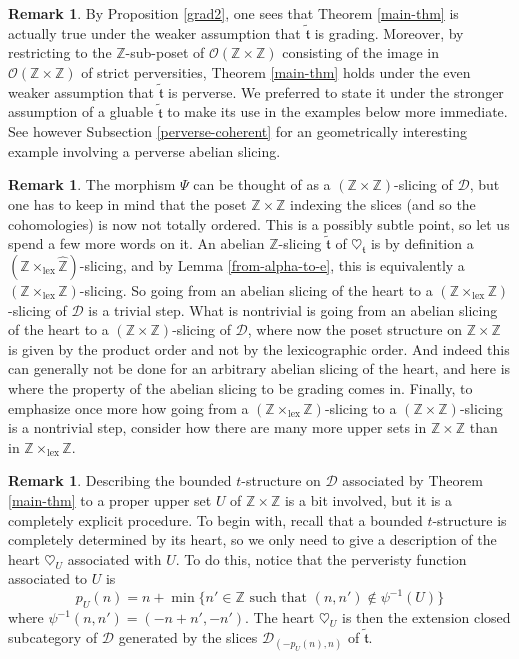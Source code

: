 \documentclass{article}
\theoremstyle{definition}
\newtheorem{rem}[thm]{Remark}
\newcommand{\Z}{\mathbb{Z}}
\newcommand{\Oo}{\mathcal{O}}
\newcommand{\tee}{\mathfrak{t}}
\begin{document}
\begin{rem}By Proposition \ref{grad2}, one sees that
Theorem \ref{main-thm} is actually true under the weaker assumption that $\tilde{\tee}$ is grading. Moreover, by restricting to the $\Z$-sub-poset of $\Oo(\Z\times\Z)$ consisting of the image in $\Oo(\Z\times\Z)$ of strict perversities, Theorem \ref{main-thm} holds under the even weaker assumption that $\tilde{\tee}$ is perverse. We preferred to state it under the stronger assumption of a gluable $\tilde{\tee}$ to make its use in the examples below more immediate. See however Subsection \ref{perverse-coherent} for an geometrically interesting example involving a perverse abelian slicing.
\end{rem}

\begin{rem}\label{main-rem}
The morphism $\Psi$ can be thought of as a $(\Z\times \Z)$-slicing of $\mathscr{D}$, but one has to keep in mind that the poset $\Z\times\Z$ indexing the slices (and so the cohomologies) is now not totally ordered. This is a possibly subtle point, so let us spend a few more words on it. An abelian $\mathbb{Z}$-slicing $\tilde{\tee}$ of $\heartsuit_\tee$ is by definition a $(\Z\times_{\mathrm{lex}}\hat{\Z})$-slicing, and by Lemma \ref{from-alpha-to-e}, this is equivalently a $(\Z\times_{\mathrm{lex}}{\Z})$-slicing. So going from an abelian slicing of the heart to a  $(\Z\times_{\mathrm{lex}}{\Z})$-slicing of $\mathscr{D}$ is a trivial step. What is nontrivial is going from an abelian slicing of the heart to a $(\Z\times{\Z})$-slicing of $\mathscr{D}$, where now the poset structure on $\Z\times \Z$ is given by the product order and not by the lexicographic order. And indeed this can generally not be done for an 
arbitrary abelian slicing of the heart, and here is where the property of the abelian slicing to be grading comes in. Finally, to emphasize once more how going from a   $(\Z\times_{\mathrm{lex}}{\Z})$-slicing to a $(\Z\times{\Z})$-slicing is a nontrivial step, consider how there are many more upper sets  in $\Z\times{\Z}$ than in $\Z\times_{\mathrm{lex}}{\Z}$.
\end{rem}
\begin{rem}
Describing the bounded $t$-structure on $\mathscr{D}$ associated by Theorem \ref{main-thm} to a proper upper set $U$ of $\Z\times \Z$ is a bit involved, but it is a completely explicit procedure. To begin with, recall that a bounded $t$-structure is completely determined by its heart, so we only need to give a description of the heart $\heartsuit_U$ associated with $U$. To do this, notice that the perveristy function associated to $U$ is
\[
p_U(n)=n+\min\{n'\in \Z\text{ such that } (n,n')\notin \psi^{-1}(U)\} 
\]
where $\psi^{-1}(n,n')=(-n+n',-n')$. The heart $\heartsuit_U$ is then the extension closed subcategory of $\mathscr{D}$ generated by the slices $\mathscr{D}_{(-p_U(n),n)}$ of $\tilde{\tee}$.
\end{rem}
\end{document}

